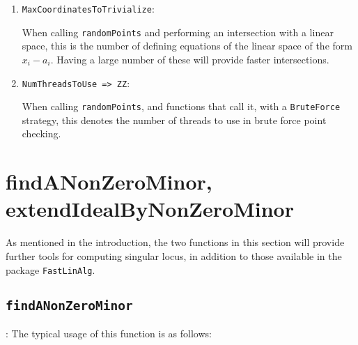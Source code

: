 \documentclass[11pt]{amsart}
\theoremstyle{definition}
\newtheorem{example}{Example}[section]
\begin{document}
\begin{enumerate}
 \begin{example}
 We re-compute \cref{BruteForce} by specifying more attempts.
 	{{\small\color{blue}
	\begin{verbatim}
i1: R = ZZ/101[x,y,z];

o1 : PolynomialRing

i2 : J = ideal "x3+y2+1,z3-x2-y2+2";

o2 : Ideal of R

i3 : randomPoints(J,Strategy=>BruteForce,PointCheckAttempts=>2000)

o3 = {{-39, -43, 28}}

o3 : List
\end{verbatim}
}}
 \end{example}

\vspace{1em}
\item {\tt MaxCoordinatesToTrivialize}:

When calling {\tt randomPoints} and performing an intersection with a linear space, this is the number of defining equations of the linear space of the form $x_i - a_i$.  Having a large number of these will provide faster intersections.

\vspace{1em}
\item {\tt NumThreadsToUse => ZZ}:

When calling {\tt randomPoints}, and functions that call it, with a {\tt BruteForce} strategy, this denotes the number of threads to use in brute force point checking.
\end{enumerate}

\section{findANonZeroMinor, extendIdealByNonZeroMinor}

As mentioned in the introduction, the two functions in this section will provide further tools for computing singular locus, in addition to those available in the package {\tt FastLinAlg}. 

	\subsection{\tt findANonZeroMinor}\label{findANonZeroMinor}: The typical usage of this function is as follows: 
	
\end{document}

